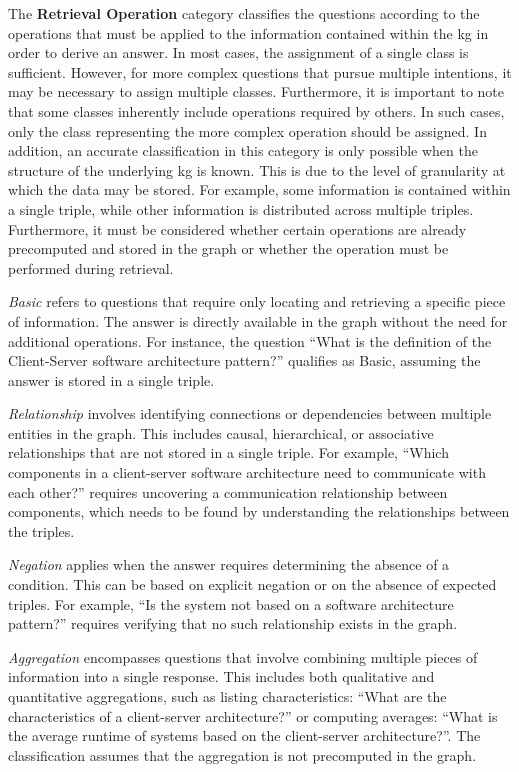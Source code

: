 The \textbf{Retrieval Operation} category classifies the questions according to the operations that must be applied to the information contained within the \gls{kg} in order to derive an answer. In most cases, the assignment of a single class is sufficient. However, for more complex questions that pursue multiple intentions, it may be necessary to assign multiple classes. Furthermore, it is important to note that some classes inherently include operations required by others. In such cases, only the class representing the more complex operation should be assigned. In addition, an accurate classification in this category is only possible when the structure of the underlying \gls{kg} is known. This is due to the level of granularity at which the data may be stored. For example, some information is contained within a single triple, while other information is distributed across multiple triples. Furthermore, it must be considered whether certain operations are already precomputed and stored in the graph or whether the operation must be performed during retrieval.

\emph{Basic} refers to questions that require only locating and retrieving a specific piece of information. The answer is directly available in the graph without the need for additional operations. For instance, the question \enquote{What is the definition of the Client-Server software architecture pattern?} qualifies as Basic, assuming the answer is stored in a single triple.

\emph{Relationship} involves identifying connections or dependencies between multiple entities in the graph. This includes causal, hierarchical, or associative relationships that are not stored in a single triple. For example, \enquote{Which components in a client-server software architecture need to communicate with each other?} requires uncovering a communication relationship between components, which needs to be found by understanding the relationships between the triples.

\emph{Negation} applies when the answer requires determining the absence of a condition. This can be based on explicit negation or on the absence of expected triples. For example, \enquote{Is the system not based on a software architecture pattern?} requires verifying that no such relationship exists in the graph.

\emph{Aggregation} encompasses questions that involve combining multiple pieces of information into a single response. This includes both qualitative and quantitative aggregations, such as listing characteristics: \enquote{What are the characteristics of a client-server architecture?} or computing averages: \enquote{What is the average runtime of systems based on the client-server architecture?}. The classification assumes that the aggregation is not precomputed in the graph.

